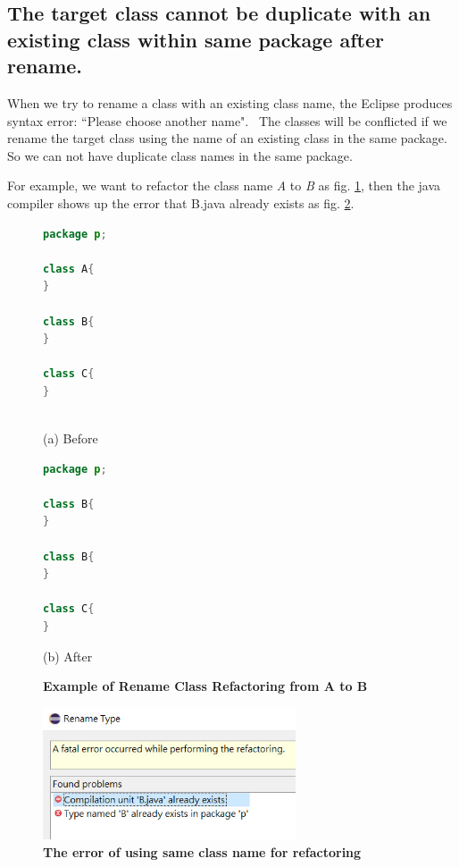 \subsection{The target class cannot be duplicate with an existing class within same package after rename.}

When we try to rename a class with an existing class name, the Eclipse produces syntax error:
``Please choose another name".~\cite{EclipseWebPage} The classes will be conflicted if we rename the target class using the name of an existing class in the same package. So we can not have duplicate class names in the same package. 

For example, we want to refactor the class name \textsl{A} to \textsl{B} as fig. \ref{fig:afterrr}, then the java compiler shows up the error that B.java already exists as fig. \ref{fig:renameclassname}.

\begin{figure}[th]
\centering
\begin{minipage}[t]{0.45\linewidth}
\begin{lstlisting}[language=java, basicstyle=\scriptsize\ttfamily,frame=single]
package p;

class A{
}
	
class B{
}

class C{
}
 
\end{lstlisting}
\tiny{(a) Before}
\end{minipage}
\hfill
\begin{minipage}[t]{0.45\linewidth}
\begin{lstlisting}[language=java, basicstyle=\scriptsize\ttfamily,frame=single]
package p;

class B{
}	

class B{
}

class C{
}

\end{lstlisting}
\tiny{(b) After}
\end{minipage}
\caption{\textbf{Example of Rename Class Refactoring from A to B}}
\label{fig:afterrr}
\end{figure}

\begin{figure}[H]
\centerline{\includegraphics[width=75mm,scale=0.4]{SCN.jpg}}
\caption{\textbf{The error of using same class name for refactoring}}
\label{fig:renameclassname}
\end{figure}

